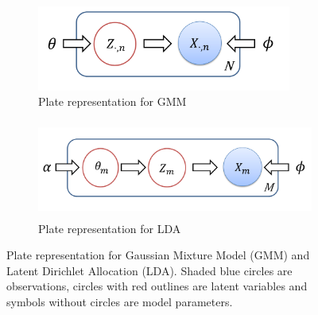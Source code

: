 \begin{figure}[!t]
    \centering
      \begin{subfigure}[H]{0.8\textwidth}
        \centering
        \includegraphics[width=0.75\linewidth, height=2.8cm,
        trim=0cm 0.2cm 1cm 0cm]{FIGURES/GMM}
        \caption{Plate representation for GMM }
    \end{subfigure}
    \begin{subfigure}[H]{0.8\textwidth}
        \centering
        \includegraphics[width=0.9\linewidth, height=3.2cm,
        trim=0cm 0.5cm 1.2cm 0cm%
        ]{FIGURES/LDA}
        \caption{Plate representation for LDA }
    \end{subfigure}%
    \caption{ Plate representation for  Gaussian Mixture Model (GMM) and Latent Dirichlet Allocation (LDA).
Shaded blue circles are observations, circles with red outlines are latent variables and symbols without circles are model parameters. %
     }
     \label{Fig:GMMvsLDA} 
\end{figure}






